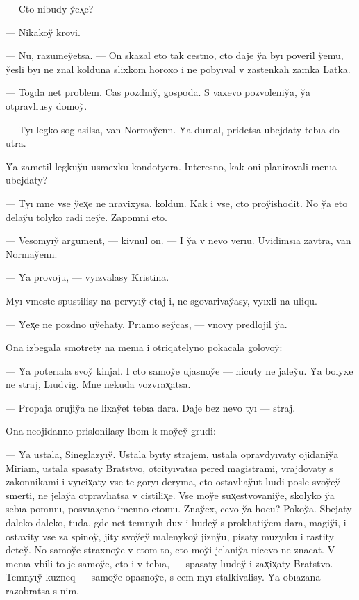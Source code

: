 \documentclass[10pt]{book}
\begin{document}
— Cto-nibudy y̆ex̨e?

— Nikakoy̆ krovi.

— Nu, razumey̆etsa. — On skazal eto tak cestno, cto daje y̆a byı poveril y̆emu, y̆esli byı ne znal kolduna slixkom horoxo i ne pobyıval v zastenkah zamka Latka.

— Togda net problem. Cas pozdniy̆, gospoda. S vaxevo pozvoleniy̆a, y̆a otpravlıusy domoy̆.

— Tyı legko soglasilsa, van Normay̆enn. Y̆a dumal, pridetsa ubejdaty tebıa do utra.

Y̆a zametil legkuy̆u usmexku kondotyera. Interesno, kak oni planirovali menıa ubejdaty?

— Tyı mne vse y̆ex̨e ne nravixysa, koldun. Kak i vse, cto proy̆ishodit. No y̆a eto delay̆u tolyko radi ney̆e. Zapomni eto.

— Vesomyıy̆ argument, — kivnul on. — I y̆a v nevo verıu. Uvidimsıa zavtra, van Normay̆enn.

— Y̆a provoju, — vyızvalasy Kristina.

Myı vmeste spustilisy na pervyıy̆ etaj i, ne sgovarivay̆asy, vyıxli na uliqu.

— Y̆ex̨e ne pozdno uy̆ehaty. Prıamo sey̆cas, — vnovy predlojil y̆a.

Ona izbegala smotrety na menıa i otriqatelyno pokacala golovoy̆:

— Y̆a poterıala svoy̆ kinjal. I cto samoy̆e ujasnoy̆e — nicuty ne jaley̆u. Y̆a bolyxe ne straj, Lıudvig. Mne nekuda vozvrax̨atsa.

— Propaja orujiy̆a ne lixay̆et tebıa dara. Daje bez nevo tyı — straj.

Ona neojidanno prislonilasy lbom k moy̆ey̆ grudi:

— Y̆a ustala, Sineglazyıy̆. Ustala byıty strajem, ustala opravdyıvaty ojidaniy̆a Miriam, ustala spasaty Bratstvo, otcityıvatsa pered magistrami, vrajdovaty s zakonnikami i vyıcix̨aty vse te goryı deryma, cto ostavlıay̆ut lıudi posle svoy̆ey̆ smerti, ne jelay̆a otpravlıatsa v cistilix̨e. Vse moy̆e sux̨estvovaniy̆e, skolyko y̆a sebıa pomnıu, posvıax̨eno imenno etomu. Znay̆ex, cevo y̆a hocu? Pokoy̆a. Sbejaty daleko-daleko, tuda, gde net temnyıh dux i lıudey̆ s proklıatiy̆em dara, magiy̆i, i ostavity vse za spinoy̆, jity svoy̆ey̆ malenykoy̆ jizny̆u, pisaty muzyıku i rastity detey̆. No samoy̆e straxnoy̆e v etom to, cto moy̆i jelaniy̆a nicevo ne znacat. V menıa vbili to je samoy̆e, cto i v tebıa, — spasaty lıudey̆ i zax̨ix̨aty Bratstvo. Temnyıy̆ kuzneq — samoy̆e opasnoy̆e, s cem myı stalkivalisy. Y̆a obıazana razobratsa s nim.
\end{document}
